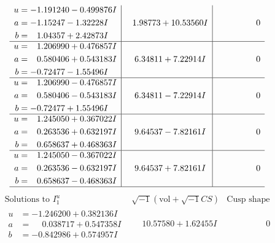 \documentclass[1p]{elsarticle_modified}
\theoremstyle{definition}
\newcommand{\I}{\sqrt{-1}}
\begin{document}
$$\begin{array}{c|c|c}
\begin{aligned}
u &= -1.191240 - 0.499876 I \\
a &= -1.15247 - 1.32228 I \\
b &= \phantom{-}1.04357 + 2.42873 I\end{aligned}
 & \phantom{-}1.98773 + 10.53560 I & \phantom{-0.000000 } 0 \\ \hline\begin{aligned}
u &= \phantom{-}1.206990 + 0.476857 I \\
a &= \phantom{-}0.580406 + 0.543183 I \\
b &= -0.72477 - 1.55496 I\end{aligned}
 & \phantom{-}6.34811 + 7.22914 I & \phantom{-0.000000 } 0 \\ \hline\begin{aligned}
u &= \phantom{-}1.206990 - 0.476857 I \\
a &= \phantom{-}0.580406 - 0.543183 I \\
b &= -0.72477 + 1.55496 I\end{aligned}
 & \phantom{-}6.34811 - 7.22914 I & \phantom{-0.000000 } 0 \\ \hline\begin{aligned}
u &= \phantom{-}1.245050 + 0.367022 I \\
a &= \phantom{-}0.263536 + 0.632197 I \\
b &= \phantom{-}0.658637 + 0.468363 I\end{aligned}
 & \phantom{-}9.64537 - 7.82161 I & \phantom{-0.000000 } 0 \\ \hline\begin{aligned}
u &= \phantom{-}1.245050 - 0.367022 I \\
a &= \phantom{-}0.263536 - 0.632197 I \\
b &= \phantom{-}0.658637 - 0.468363 I\end{aligned}
 & \phantom{-}9.64537 + 7.82161 I & \phantom{-0.000000 } 0\\
 \hline 
 \end{array}$$\newpage$$\begin{array}{c|c|c}  
\text{Solutions to }I^u_{1}& \I (\text{vol} + \sqrt{-1}CS) & \text{Cusp shape}\\
 \hline 
\begin{aligned}
u &= -1.246200 + 0.382136 I \\
a &= \phantom{-}0.038717 + 0.547358 I \\
b &= -0.842986 + 0.574957 I\end{aligned}
 & \phantom{-}10.57580 + 1.62455 I & \phantom{-0.000000 } 0 \\ \hline\begin{aligned}

\end{aligned}
\end{array}$$
\end{document}
